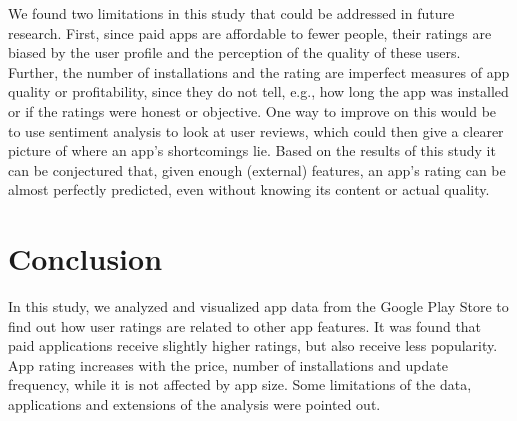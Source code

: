 \documentclass{article}
\begin{document}
We found two limitations in this study that could be addressed in future research. First, since paid apps are affordable to fewer people, their ratings are biased by the user profile and the perception of the quality of these users. Further, the number of installations and the rating are imperfect measures of app quality or profitability, since they do not tell, e.g., how long the app was installed or if the ratings were honest or objective. One way to improve on this would be to use sentiment analysis to look at user reviews, which could then give a clearer picture of where an app's shortcomings lie. Based on the results of this study it can be conjectured that, given enough (external) features, an app's rating can be almost perfectly predicted, even without knowing its content or actual quality.

\section{Conclusion}

In this study, we analyzed and visualized app data from the Google Play Store to find out how user ratings are related to other app features. It was found that paid applications receive slightly higher ratings, but also receive less popularity. App rating increases with the price, number of installations and update frequency, while it is not affected by app size. Some limitations of the data, applications and extensions of the analysis were pointed out.

\appendix
\printbibliography
\end{document}
